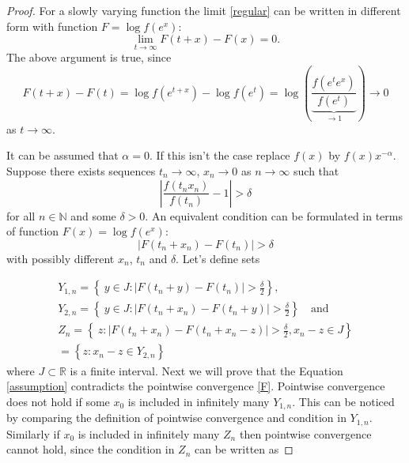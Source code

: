 \documentclass[english,12pt,a4paper,pdftex,sci,utf8]{aaltothesis} %
\begin{document}
\begin{proof}


For a slowly varying function the limit \eqref{regular} can be written in different form with function $F=\log f(e^x)$:
\begin{equation}
\lim_{t \rightarrow \infty} F(t+x)-F(x) = 0.
\label{F}
\end{equation}
The above argument is true, since
\begin{equation*}
F(t+x)-F(t) = \log f(e^{t+x}) - \log f(e^{t}) = \log \left(\underbrace{\frac{f(e^te^x)}{f(e^t)}}_{\rightarrow 1}\right) \rightarrow 0
\end{equation*}
as $t \rightarrow \infty$.





It can be assumed that $\alpha=0$. If this isn't the case replace $f(x)$ by $f(x)x^{-\alpha}$. Suppose there exists sequences $t_n \rightarrow \infty$, $x_n \rightarrow 0$ as $n \rightarrow \infty$ such that
\begin{equation*}
\left| \frac{f(t_nx_n)}{f(t_n)} - 1 \right| > \delta
\end{equation*}
for all $n \in \mathbb{N}$ and some $\delta>0$. An equivalent condition can be formulated in terms of function $F(x) = \log f(e^x)$:
\begin{equation}
\left| F(t_n+x_n) - F(t_n) \right| > \delta
\label{assumption}
\end{equation}
with possibly different $x_n$, $t_n$ and $\delta$. Let's define sets

\begin{align*}
Y_{1,n} = \left\{ \ y \in J: \left| F(t_n+y)-F(t_n) \right| > \frac{\delta}{2} \right\}, \\
Y_{2,n} = \left\{ \ y \in J: \left| F(t_n+x_n)-F(t_n+y) \right| > \frac{\delta}{2} \right\} \quad  \textrm{and} \\
Z_n = \left\{ \ z: \left| F(t_n+x_n)-F(t_n+x_n-z) \right| > \frac{\delta}{2}, x_n-z \in J \right\} \\
= \left\{ z: x_n-z \in Y_{2,n} \right\}
\end{align*}
where $J \subset \mathbb{R}$ is a finite interval. Next we will prove that the Equation \eqref{assumption} contradicts the pointwise convergence \eqref{F}. Pointwise convergence does not hold if some $x_0$ is included in infinitely many $Y_{1,n}$. This can be noticed by comparing the definition of pointwise convergence and condition in $Y_{1,n}$. Similarly if $x_0$ is included in infinitely many $Z_n$ then pointwise convergence cannot hold, since the condition in $Z_{n}$ can be written as


\end{proof}
\end{document}
